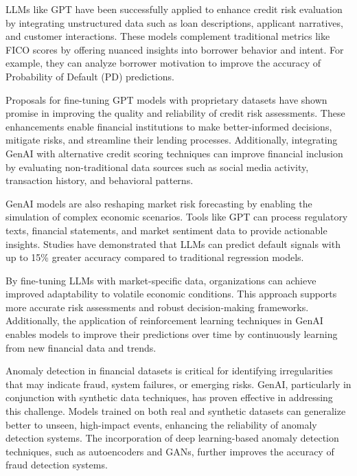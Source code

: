 \documentclass[a4paper,headinclude=on,footinclude=on,12pt,oneside]{scrbook}
\begin{document}
	
	
	LLMs like GPT have been successfully applied to enhance credit risk evaluation by integrating unstructured data such as loan descriptions, applicant narratives, and customer interactions. These models complement traditional metrics like FICO scores by offering nuanced insights into borrower behavior and intent. For example, they can analyze borrower motivation to improve the accuracy of Probability of Default (PD) predictions.
	
	Proposals for fine-tuning GPT models with proprietary datasets have shown promise in improving the quality and reliability of credit risk assessments. These enhancements enable financial institutions to make better-informed decisions, mitigate risks, and streamline their lending processes. Additionally, integrating GenAI with alternative credit scoring techniques can improve financial inclusion by evaluating non-traditional data sources such as social media activity, transaction history, and behavioral patterns.
	
	
	GenAI models are also reshaping market risk forecasting by enabling the simulation of complex economic scenarios. Tools like GPT can process regulatory texts, financial statements, and market sentiment data to provide actionable insights. Studies have demonstrated that LLMs can predict default signals with up to 15\% greater accuracy compared to traditional regression models.
	
	By fine-tuning LLMs with market-specific data, organizations can achieve improved adaptability to volatile economic conditions. This approach supports more accurate risk assessments and robust decision-making frameworks. Additionally, the application of reinforcement learning techniques in GenAI enables models to improve their predictions over time by continuously learning from new financial data and trends.
	
	
	Anomaly detection in financial datasets is critical for identifying irregularities that may indicate fraud, system failures, or emerging risks. GenAI, particularly in conjunction with synthetic data techniques, has proven effective in addressing this challenge. Models trained on both real and synthetic datasets can generalize better to unseen, high-impact events, enhancing the reliability of anomaly detection systems. The incorporation of deep learning-based anomaly detection techniques, such as autoencoders and GANs, further improves the accuracy of fraud detection systems.
	
\end{document}
